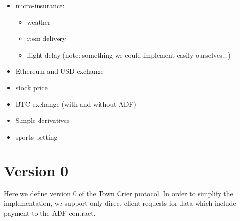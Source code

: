 \begin{itemize}
\item micro-insurance:
    \begin{itemize}
    \item weather
    \item item delivery
    \item flight delay (note: something we could implement easily ourselves...)
    \end{itemize}
\item Ethereum and USD exchange
\item stock price
\item BTC exchange (with and without ADF)
\item Simple derivatives
\item sports betting
\end{itemize}







\section{Version 0}

Here we define version 0 of the Town Crier protocol.
In order to simplify the implementation, we support only direct client requests for data which include payment to the ADF contract.

